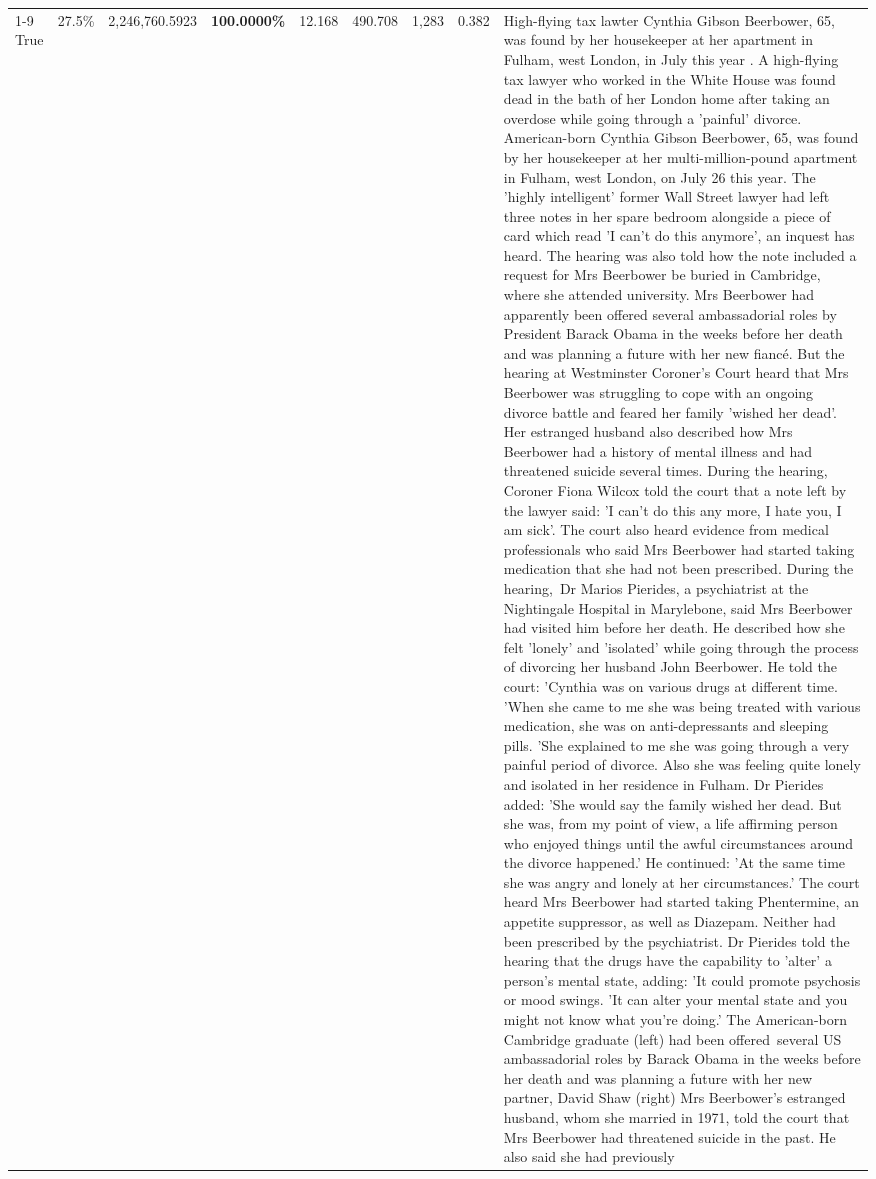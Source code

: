 \begin{table}[H]
\begin{tabular}{lllrlllll}
\cline{1-9}
True & 27.5\% & 2,246,760.5923 & \bfseries \color{red} 100.0000\% & 12.168 & 490.708 & 1,283 & 0.382 & High-flying tax lawter Cynthia Gibson Beerbower, 65, was found by her housekeeper at her apartment in Fulham, west London, in July this year . A high-flying tax lawyer who worked in the White House was found dead in the bath of her London home after taking an overdose while going through a 'painful' divorce. American-born Cynthia Gibson Beerbower, 65, was found by her housekeeper at her multi-million-pound apartment in Fulham, west London, on July 26 this year. The 'highly intelligent' former Wall Street lawyer had left three notes in her spare bedroom alongside a piece of card which read 'I can't do this anymore', an inquest has heard. The hearing was also told how the note included a request for Mrs Beerbower be buried in Cambridge, where she attended university. Mrs Beerbower had apparently been offered several ambassadorial roles by President Barack Obama in the weeks before her death and was planning a future with her new fiancé. But the hearing at Westminster Coroner's Court heard that Mrs Beerbower was struggling to cope with an ongoing divorce battle and feared her family 'wished her dead'. Her estranged husband also described how Mrs Beerbower had a history of mental illness and had threatened suicide several times. During the hearing, Coroner Fiona Wilcox told the court that a note left by the lawyer said: 'I can't do this any more, I hate you, I am sick'. The court also heard evidence from medical professionals who said Mrs Beerbower had started taking medication that she had not been prescribed. During the hearing, Dr Marios Pierides, a psychiatrist at the Nightingale Hospital in Marylebone, said Mrs Beerbower had visited him before her death. He described how she felt 'lonely' and 'isolated' while going through the process of divorcing her husband John Beerbower. He told the court: 'Cynthia was on various drugs at different time. 'When she came to me she was being treated with various medication, she was on anti-depressants and sleeping pills. 'She explained to me she was going through a very painful period of divorce. Also she was feeling quite lonely and isolated in her residence in Fulham. Dr Pierides added: 'She would say the family wished her dead. But she was, from my point of view, a life affirming person who enjoyed things until the awful circumstances around the divorce happened.' He continued: 'At the same time she was angry and lonely at her circumstances.' The court heard Mrs Beerbower had started taking Phentermine, an appetite suppressor, as well as Diazepam. Neither had been prescribed by the psychiatrist. Dr Pierides told the hearing that the drugs have the capability to 'alter' a person's mental state, adding: 'It could promote psychosis or mood swings. 'It can alter your mental state and you might not know what you're doing.' The American-born Cambridge graduate (left) had been offered several US ambassadorial roles by Barack Obama in the weeks before her death and was planning a future with her new partner, David Shaw (right) Mrs Beerbower's estranged husband, whom she married in 1971, told the court that Mrs Beerbower had threatened suicide in the past. He also said she had previously 
\end{tabular}
\end{table}
